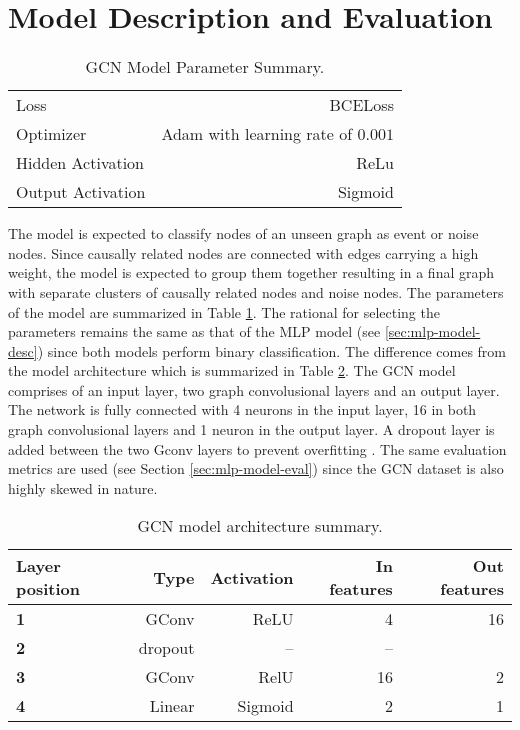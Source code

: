 \section{Model Description and Evaluation}
\label{sec:gcn-model-desc-eval}

\begin{table}[htb]
  \centering
  \caption{GCN Model Parameter Summary.}
  \begin{tabular}{lr}
    \hline
    Loss & BCELoss \\
    Optimizer & Adam with learning rate of $0.001$ \\
    Hidden Activation & ReLu \\
    Output Activation & Sigmoid \\
    \hline
  \end{tabular}
  \label{tab:gcn-model-param}
\end{table}

The model is expected to classify nodes of an unseen graph as event or
noise nodes. Since causally related nodes are connected with edges
carrying a high weight, the model is expected to group them together
resulting in a final graph with separate clusters of causally related
nodes and noise nodes. The parameters of the model are summarized in
Table \ref{tab:gcn-model-param}. The rational for selecting the
parameters remains the same as that of the MLP model (see
\ref{sec:mlp-model-desc}) since both models perform binary
classification. The difference comes from the model architecture which
is summarized in Table \ref{tab:gcn-model-arch}. The GCN model
comprises of an input layer, two graph convolusional layers and an
output layer. The network is fully connected with 4 neurons in the
input layer, 16 in both graph convolusional layers and 1 neuron in the
output layer. A dropout layer is added between the two Gconv layers to
prevent overfitting \cite{srivastava14dropout}. The same evaluation
metrics are used (see Section \ref{sec:mlp-model-eval}) since the GCN
dataset is also highly skewed in nature.

\begin{table}
  \centering
  \caption{GCN model architecture summary.}
  \begin{tabular}{lrrrr}
    \hline
    Layer position & Type & Activation & In features & Out features \\
    \hline
    \textbf{1} & GConv & ReLU & 4 & 16 \\
    \textbf{2} & dropout & -- & -- \\
    \textbf{3} & GConv & RelU & 16 & 2 \\
    \textbf{4} & Linear & Sigmoid & 2 & 1 \\
    \hline
  \end{tabular}
  \label{tab:gcn-model-arch}
\end{table}

